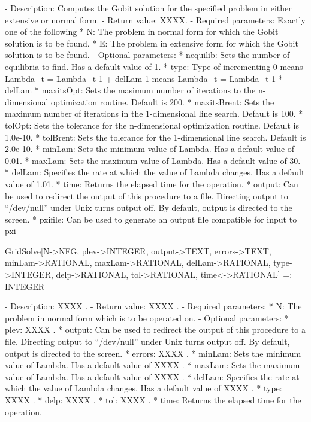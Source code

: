    -	Description:  Computes the Gobit solution for the specified problem in
	either extensive or normal form.  
   -	Return value:  XXXX.
   -	Required parameters:  Exactly one of the following
	  *  N:  The problem in normal form for which the Gobit solution is to
		be found.
	  *  E:  The problem in extensive form for which the Gobit solution 
		is to be found.
   -	Optional parameters:
	  *  nequilib:  Sets the number of equilibria to find.  Has a default 
		value of 1.  
	  *  type:   Type of incrementing 
			0 means Lambda_t = Lambda_{t-1} + delLam
			1 means Lambda_t = Lambda_{t-1} * delLam
	  *  maxitsOpt:  Sets the masimum number of iterations to the 
		n-dimensional optimization routine.  Default is 200.
	  *  maxitsBrent:  Sets the maximum number of iterations in
		the 1-dimensional line search.  Default is 100.
	  *  tolOpt:  Sets the tolerance for the n-dimensional
		optimization routine.  Default is 1.0e-10.
	  *  tolBrent:  Sets the tolerance for the 1-dimensional line
		search.  Default is 2.0e-10.
	  *  minLam:  Sets the minimum value of Lambda.  Has a default value of
		0.01.
	  *  maxLam:  Sets the maximum value of Lambda.  Has a default value of
		30.
	  *  delLam:  Specifies the rate at which the value of Lambda changes.
		Has a default value of 1.01.
	  *  time:  Returns the elapsed time for the operation.
	  *  output:  Can be used to redirect the output of this procedure to a
		file.  Directing output to ``/dev/null'' under Unix turns 
		output off.  By default, output is directed to the screen.
	  *  pxifile: Can be used to generate an output file
		compatible for input to pxi
----------

GridSolve[N->NFG, {plev->INTEGER}, {output->TEXT}, {errors->TEXT},
	{minLam->RATIONAL}, {maxLam->RATIONAL}, {delLam->RATIONAL}, 
	{type->INTEGER}, {delp->RATIONAL}, {tol->RATIONAL}, {time<->RATIONAL}]
	 =: INTEGER

   -	Description:  XXXX .
   -	Return value:  XXXX .
   -	Required parameters:
	  *  N:  The problem in normal form which is to be operated on.
   -	Optional parameters:
	  *  plev:  XXXX .
	  *  output:  Can be used to redirect the output of this procedure to a
		file.  Directing output to ``/dev/null'' under Unix turns 
		output off.  By default, output is directed to the screen.
	  *  errors:  XXXX .
	  *  minLam:  Sets the minimum value of Lambda.  Has a default value of
		XXXX .
	  *  maxLam:  Sets the maximum value of Lambda.  Has a default value of
		XXXX .
	  *  delLam:  Specifies the rate at which the value of Lambda changes.
		Has a default value of XXXX .
	  *  type:  XXXX .
	  *  delp:  XXXX .
	  *  tol:  XXXX .
	  *  time:  Returns the elapsed time for the operation.

